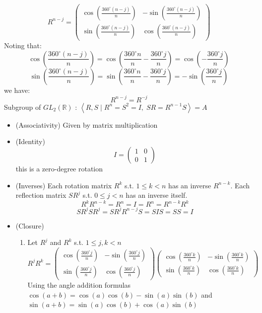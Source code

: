 \documentclass[12pt, letterpaper]{article}
\theoremstyle{definition}
\newcommand{\R}{\mathbb{R}}
\newcommand{\ang}[1]{\left\langle #1 \right\rangle}
\begin{document}
\[
R^{n-j} = \begin{pmatrix}
\cos\left(\frac{360^\circ (n-j)}{n}\right) & -\sin\left(\frac{360^\circ (n-j)}{n}\right) \\
\sin\left(\frac{360^\circ (n-j)}{n}\right) & \cos\left(\frac{360^\circ (n-j)}{n}\right)
\end{pmatrix}
\]
Noting that:
\[
\cos\left(\frac{360^\circ (n-j)}{n}\right) = \cos\left(\frac{360^\circ n}{n} - \frac{360^\circ j}{n}\right) = \cos\left(-\frac{360^\circ j}{n}\right)
\]
\[
\sin\left(\frac{360^\circ (n-j)}{n}\right) = \sin\left(\frac{360^\circ n}{n} - \frac{360^\circ j}{n}\right) = -\sin\left(\frac{360^\circ j}{n}\right)
\]
we have:
\[
R^{n-j} = R^{-j}
\]
Subgroup of $GL_2(\R)$ : $\ang{R,S \mid R^n=S^2=I,\; SR=R^{n-1}S}=A$
\begin{itemize}
    \item (Associativity) Given by matrix multiplication
    \item (Identity) \[I = \begin{pmatrix}
        1 & 0 \\
        0 & 1
        \end{pmatrix}\] this is a zero-degree rotation
    \item (Inverses) Each rotation matrix $R^k$ s.t. $1 \leq k < n$ has an inverse $R^{n-k}$. Each
    reflection matrix $SR^j$ s.t. $0 \leq j < n$ has an inverse itself.
    \[R^kR^{n-k}=R^n=I=R^n=R^{n-k}R^k\]
    \[SR^jSR^j=SR^jR^{n-j}S=SIS=SS=I\]
    \item (Closure) \begin{enumerate}
        \item Let $R^j$ and $R^k$ s.t. $1\leq j,k < n$
        \[R^jR^k=\begin{pmatrix}
            \cos\left(\frac{360^\circ j}{n}\right) & -\sin\left(\frac{360^\circ j}{n}\right) \\
            \sin\left(\frac{360^\circ j}{n}\right) & \cos\left(\frac{360^\circ j}{n}\right)
            \end{pmatrix}
            \begin{pmatrix}
                \cos\left(\frac{360^\circ k}{n}\right) & -\sin\left(\frac{360^\circ k}{n}\right) \\
                \sin\left(\frac{360^\circ k}{n}\right) & \cos\left(\frac{360^\circ k}{n}\right)
            \end{pmatrix}
        \]
        Using the angle addition formulas $\cos(a+b) = \cos(a)\cos(b)-\sin(a)\sin(b)$ and $\sin(a+b)=\sin(a)\cos(b)+\cos(a)\sin(b)$
        \[
\]
\end{enumerate}
\end{itemize}
\end{document}
